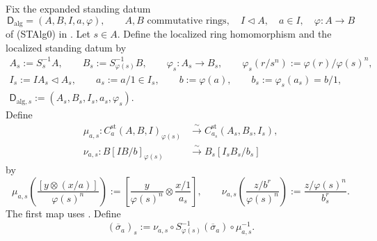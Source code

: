 \begin{definition}
  \label{def:nagata-strict-transform-chart-comparison-localized}
  \lean{}

  Fix the expanded standing datum
  \[
    \mathsf D_{\mathrm{alg}}=(A,B,I,a,\varphi),\qquad
    A,B\text{ commutative rings},\quad
    I\triangleleft A,\quad a\in I,\quad
    \varphi\colon A\to B
  \]
  of (STAlg0) in
  .
  Let $s\in A$.  Define the localized ring homomorphism and the localized
  standing datum by
  \[
  \begin{gathered}
    A_s:=S_s^{-1}A,\qquad
    B_s:=S_{\varphi(s)}^{-1}B,\qquad
    \varphi_s\colon A_s\to B_s,\qquad
    \varphi_s(r/s^n):=\varphi(r)/\varphi(s)^n,\\
    I_s:=IA_s\triangleleft A_s,\qquad
    a_s:=a/1\in I_s,\qquad
    b:=\varphi(a),\qquad
    b_s:=\varphi_s(a_s)=b/1,\\
    \mathsf D_{\mathrm{alg},s}
      :=(A_s,B_s,I_s,a_s,\varphi_s).
  \end{gathered}                                                     \tag{STAlg1}
  \]
  Define
  \[
  \begin{aligned}
    \mu_{a,s}\colon
      C_a^{\mathrm{st}}(A,B,I)_{\varphi(s)}
        &\xrightarrow{\sim}C_{a_s}^{\mathrm{st}}(A_s,B_s,I_s),\\
    \nu_{a,s}\colon
      B[IB/b]_{\varphi(s)}
        &\xrightarrow{\sim}B_s[I_sB_s/b_s]
  \end{aligned}
  \]
  by
  \[
    \mu_{a,s}\left(
      \frac{[y\otimes(x/a)]}{\varphi(s)^n}\right)
      :=\left[\frac y{\varphi(s)^n}\otimes\frac{x/1}{a_s}\right],
    \qquad
    \nu_{a,s}\left(\frac{z/b^r}{\varphi(s)^n}\right)
      :=\frac{z/\varphi(s)^n}{b_s^r}.
  \]
  The first map uses
  .  Define
  \[
    (\overline\sigma_a)_s
      :=\nu_{a,s}\circ
        S_{\varphi(s)}^{-1}(\overline\sigma_a)\circ\mu_{a,s}^{-1}.
  \]
\end{definition}

